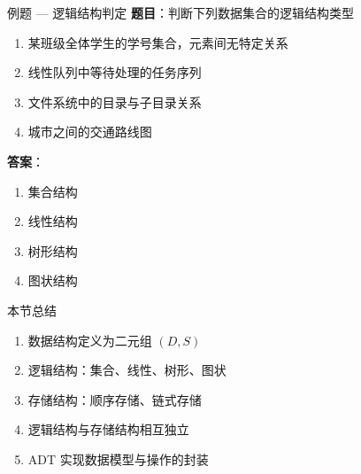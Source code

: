 \documentclass[10pt, aspectratio=169]{beamer}
\begin{document}
\begin{frame}{例题 --- 逻辑结构判定}
    \textbf{题目}：判断下列数据集合的逻辑结构类型
    \begin{enumerate}
        \item 某班级全体学生的学号集合，元素间无特定关系
        \item 线性队列中等待处理的任务序列
        \item 文件系统中的目录与子目录关系
        \item 城市之间的交通路线图
    \end{enumerate}
    \vspace{0.5em}
    \textbf{答案}：
    \begin{enumerate}
        \item 集合结构
        \item 线性结构
        \item 树形结构
        \item 图状结构
    \end{enumerate}
\end{frame}

\begin{frame}{本节总结}
    \begin{enumerate}
        \item 数据结构定义为二元组 $(D, S)$
        \item 逻辑结构：集合、线性、树形、图状
        \item 存储结构：顺序存储、链式存储
        \item 逻辑结构与存储结构相互独立
        \item ADT 实现数据模型与操作的封装
    \end{enumerate}
\end{frame}
\end{document}
